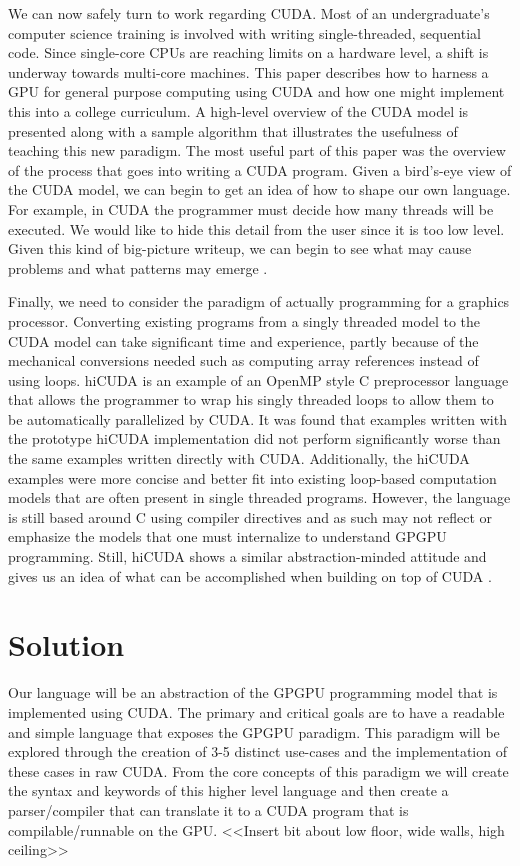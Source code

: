 \documentclass{article}
\begin{document}
We can now safely turn to work regarding CUDA. Most of an undergraduate's computer science training is involved with writing single-threaded, sequential code. Since single-core CPUs are reaching limits on a hardware level, a shift is underway towards multi-core machines. This paper describes how to harness a GPU for general purpose computing using CUDA and how one might implement this into a college curriculum. A high-level overview of the CUDA model is presented along with a sample algorithm that illustrates the usefulness of teaching this new paradigm. The most useful part of this paper was the overview of the process that goes into writing a CUDA program. Given a bird's-eye view of the CUDA model, we can begin to get an idea of how to shape our own language. For example, in CUDA the programmer must decide how many threads will be executed. We would like to hide this detail from the user since it is too low level. Given this kind of big-picture writeup, we can begin to see what may cause problems and what patterns may emerge \cite{tran}.

Finally, we need to consider the paradigm of actually programming for a graphics processor. Converting existing programs from a singly threaded model to the CUDA model can take significant time and experience, partly because of the mechanical conversions needed such as computing array references instead of using loops. hiCUDA is an example of an OpenMP style C preprocessor language that allows the programmer to wrap his singly threaded loops to allow them to be automatically parallelized by CUDA. It was found that examples written with the prototype hiCUDA implementation did not perform significantly worse than the same examples written directly with CUDA. Additionally, the hiCUDA examples were more concise and better fit into existing loop-based computation models that are often present in single threaded programs. However, the language is still based around C using compiler directives and as such may not reflect or emphasize the models that one must internalize to understand GPGPU programming. Still, hiCUDA shows a similar abstraction-minded attitude and gives us an idea of what can be accomplished when building on top of CUDA \cite{han}.

\section{Solution}
Our language will be an abstraction of the GPGPU programming model that is implemented using CUDA. The primary and critical goals are to have a readable and simple language that exposes the GPGPU paradigm. This paradigm will be explored through the creation of 3-5 distinct use-cases and the implementation of these cases in raw CUDA. From the core concepts of this paradigm we will create the syntax and keywords of this higher level language and then create a parser/compiler that can translate it to a CUDA program that is compilable/runnable on the GPU. <<Insert bit about low floor, wide walls, high ceiling>>
\end{document}
